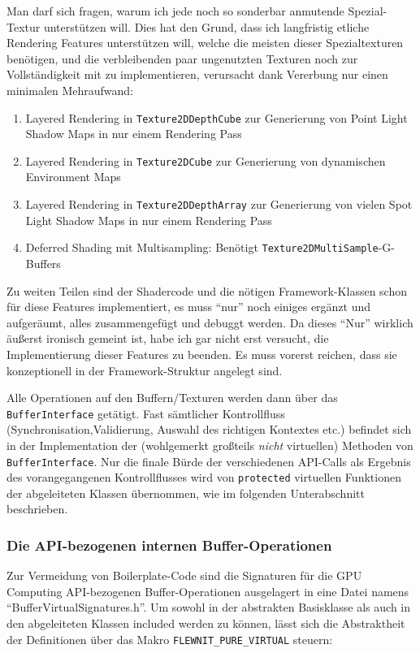 	Man darf sich fragen, warum ich jede noch so sonderbar anmutende Spezial-Textur unterstützen will. Dies
	hat den Grund, dass ich langfristig etliche Rendering Features unterstützen will, welche die meisten dieser 	
	Spezialtexturen benötigen, und die verbleibenden paar ungenutzten Texturen noch zur Vollständigkeit mit zu 
	implementieren, verursacht dank Vererbung nur einen minimalen Mehraufwand:
	\begin{enumerate}
		\item Layered Rendering in \lstinline|Texture2DDepthCube| zur Generierung von Point Light Shadow Maps
		in nur einem Rendering Pass
		\item Layered Rendering in \lstinline|Texture2DCube| zur Generierung von dynamischen Environment Maps
		\item  Layered Rendering in \lstinline|Texture2DDepthArray| zur Generierung von vielen Spot Light Shadow Maps
		in nur einem Rendering Pass
		\item Deferred Shading mit Multisampling: Benötigt \lstinline|Texture2DMultiSample|-G-Buffers
	\end{enumerate}
	Zu weiten Teilen sind der Shadercode und die nötigen Framework-Klassen schon für diese Features implementiert,
	es muss "`nur"' noch einiges ergänzt und aufgeräumt, alles zusammengefügt und debuggt werden. 
	Da dieses "`Nur"' wirklich äußerst ironisch gemeint ist, habe ich gar nicht erst versucht, 
	die Implementierung dieser Features zu beenden. Es muss vorerst reichen,
	dass sie konzeptionell in der Framework-Struktur angelegt sind.
	
	
	
	Alle Operationen auf den Buffern/Texturen werden dann über das \lstinline|BufferInterface|
	getätigt. Fast sämtlicher Kontrollfluss (Synchronisation,Validierung, Auswahl des richtigen Kontextes etc.)
	befindet sich in der Implementation	der (wohlgemerkt großteils \emph{nicht} virtuellen) 
	Methoden von \lstinline|BufferInterface|. 
	Nur die finale Bürde der verschiedenen API-Calls als Ergebnis des vorangegangenen Kontrollflusses
	wird von \lstinline|protected| virtuellen Funktionen der abgeleiteten Klassen übernommen, wie im folgenden 	
	Unterabschnitt beschrieben.
	
	\subsubsection{Die API-bezogenen internen Buffer-Operationen}
	Zur Vermeidung von Boilerplate-Code sind die Signaturen für die GPU Computing API-bezogenen 
	Buffer-Operationen ausgelagert in eine Datei namens "`BufferVirtualSignatures.h"'.
	Um sowohl in der abstrakten Basisklasse als auch in den abgeleiteten Klassen included werden zu können,
	lässt sich die Abstraktheit der Definitionen über das Makro \lstinline|FLEWNIT_PURE_VIRTUAL| steuern:
		
